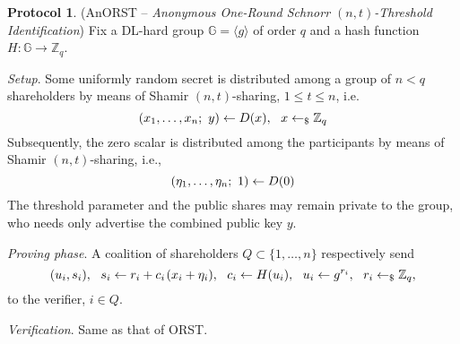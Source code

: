 \documentclass[psamsfonts, reqno]{amsart}
\theoremstyle{definition}
\newtheorem{protocol}[thm]{Protocol}
\theoremstyle{remark}
\numberwithin{equation}{section}
\begin{document}
\begin{protocol}\label{anon_protocol}
(\textsf{AnORST} -- \textit{Anonymous One-Round Schnorr $(n, t)$-Threshold Identification})
Fix a DL-hard group $\mathbb{G} = \langle g \rangle$ of order $q$
and a hash function $H: \mathbb{G} \rightarrow \mathbb{Z}_q$.
\enumerate[label=$\circ$, leftmargin=17pt]
\vspace{5pt}
\item \textit{Setup}. Some uniformly random secret is
distributed among a group of $n < q$ shareholders
by means of Shamir $(n, t)$-sharing, $1 \le t \le n$, i.e.
\vspace{5pt}
\begin{equation}\label{anorst_sharing}
(x_1, \dots, x_n;\ y) \leftarrow D(x),
\ \ x \leftarrow_\$ \mathbb{Z}_q
\vspace{5pt}
\end{equation}
Subsequently, the zero scalar is distributed
among the participants by means of Shamir $(n, t)$-sharing, i.e.,
\vspace{5pt}
\begin{equation}\label{anorst_zero_sharing}
(\eta_1, \dots, \eta_n;\ 1) \leftarrow D(0)
\vspace{5pt}
\end{equation}
The threshold parameter and the public shares
may remain private to the group,
who needs only advertise the combined public key $y$.
\vspace{5pt}
\item \textit{Proving phase}. A coalition of shareholders
$Q \subset \{1, \dots, n\}$ respectively send
\vspace{5pt}
\begin{equation*}
(u_i, s_i),
\ \ s_i \leftarrow r_i + c_i \hspace{1pt} (x_i + \eta_i),
\ \ c_i \leftarrow H(u_i),
\ \ u_i \leftarrow g ^ {r_i},
\ \ r_i \leftarrow_\$ \mathbb{Z}_q,
\vspace{5pt}
\end{equation*}
to the verifier, $i \in Q$.
\vspace{5pt}
\item \textit{Verification}.
Same as that of \textsf{ORST}.
\end{protocol}
\end{document}

